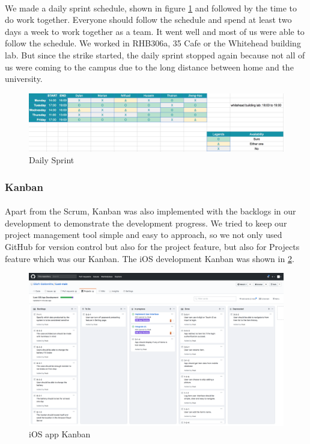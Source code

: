 \documentclass[12pt,a4paper]{article}
\begin{document}
          \paragraph{}We made a daily sprint schedule, shown in figure \ref{fig:Daily Sprint} and followed by the time to do work together. Everyone should follow the schedule and spend at least two days a week to work together as a team. It went well and most of us were able to follow the schedule. We worked in RHB306a, 35 Cafe or the Whitehead building lab. But since the strike started, the daily sprint stopped again because not all of us were coming to the campus due to the long distance between home and the university. 

          \begin{figure}[H]
            \centering
            \includegraphics[width=1\textwidth]{../assets/development-records-daily-sprint.png}
            \caption{Daily Sprint}
            \label{fig:Daily Sprint}
          \end{figure}

        \subsubsection{Kanban}
          \paragraph{}Apart from the Scrum, Kanban was also implemented with the backlogs in our development to demonstrate the development progress. We tried to keep our project management tool simple and easy to approach, so we not only used GitHub for version control but also for the project feature, but also for Projects feature which was our Kanban. The iOS  development Kanban was shown in \ref{fig:iOS Development Kanban}.

          \begin{figure}[H]
            \centering
            \includegraphics[width=1\textwidth]{../assets/development-records-ios-kanban.png}
            \caption{iOS app Kanban}
            \label{fig:iOS Development Kanban}
          \end{figure}
         
\end{document}
